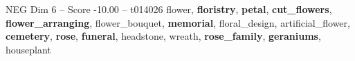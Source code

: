 \begin{textsample}{NEG Dim 6 – Score -10.00 – t014026}  \label{ex:f6_neg_013}
flower, \textbf{floristry}, \textbf{petal}, \textbf{cut\_flowers}, \textbf{flower\_arranging}, flower\_bouquet, \textbf{memorial}, floral\_design, artificial\_flower, \textbf{cemetery}, \textbf{rose}, \textbf{funeral}, headstone, wreath, \textbf{rose\_family}, \textbf{geraniums}, houseplant

\end{textsample}
